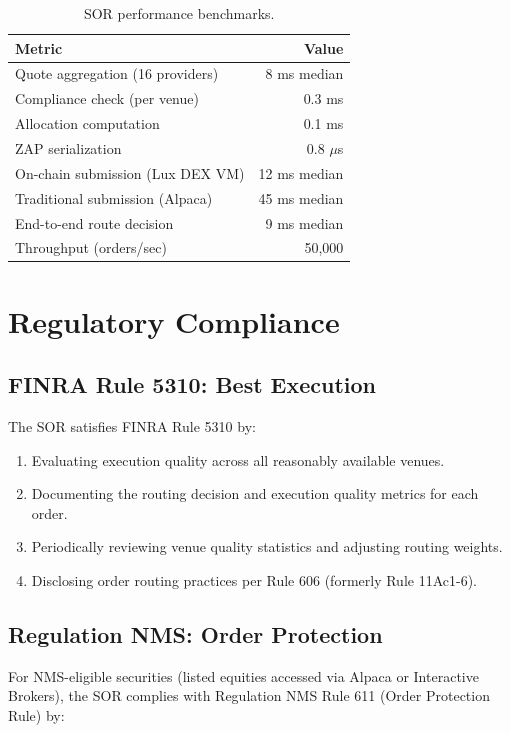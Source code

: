 \documentclass[11pt,a4paper]{article}
\begin{document}
\begin{table}[H]
\centering
\caption{SOR performance benchmarks.}
\label{tab:benchmarks}
\begin{tabular}{lr}
\toprule
\textbf{Metric} & \textbf{Value} \\
\midrule
Quote aggregation (16 providers) & 8 ms median \\
Compliance check (per venue) & 0.3 ms \\
Allocation computation & 0.1 ms \\
ZAP serialization & 0.8 $\mu$s \\
On-chain submission (Lux DEX VM) & 12 ms median \\
Traditional submission (Alpaca) & 45 ms median \\
End-to-end route decision & 9 ms median \\
Throughput (orders/sec) & 50,000 \\
\bottomrule
\end{tabular}
\end{table}

\section{Regulatory Compliance}\label{sec:regulatory}

\subsection{FINRA Rule 5310: Best Execution}

The SOR satisfies FINRA Rule 5310 by:

\begin{enumerate}[nosep]
  \item Evaluating execution quality across all reasonably available venues.
  \item Documenting the routing decision and execution quality metrics for each order.
  \item Periodically reviewing venue quality statistics and adjusting routing weights.
  \item Disclosing order routing practices per Rule 606 (formerly Rule 11Ac1-6).
\end{enumerate}

\subsection{Regulation NMS: Order Protection}

For NMS-eligible securities (listed equities accessed via Alpaca or Interactive Brokers), the SOR complies with Regulation NMS Rule 611 (Order Protection Rule) by:
\end{document}
